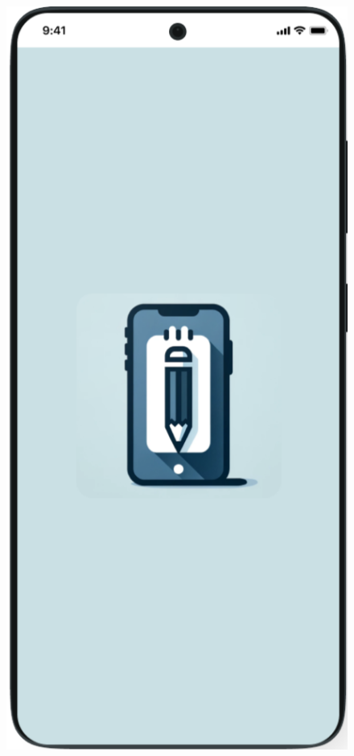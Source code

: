 \documentclass[czech, bc, kiv, he, iso690numb]{fasthesis}
\begin{document}
\begin{figure}[h!]
  \centering
  \begin{minipage}[h]{0.30\textwidth}
    \includegraphics[width=\textwidth]{img/BP-Runt/Planning/UI/Splash screen_upravene.png}

\end{minipage}
\end{figure}
\end{document}
